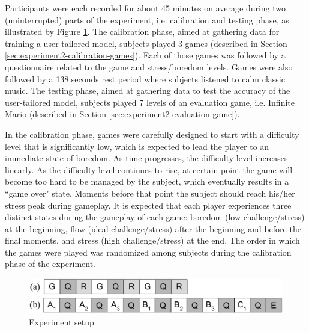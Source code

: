 Participants were each recorded for about 45 minutes on average during two (uninterrupted) parts of the experiment, i.e. calibration and testing phase, as illustrated by Figure \ref{fig:experiment2-parts}. The calibration phase, aimed at gathering data for training a user-tailored model, subjects played 3 games (described in Section \ref{sec:experiment2-calibration-games}). Each of those games was followed by a questionnaire related to the game and stress/boredom levels. Games were also followed by a 138 seconds rest period where subjects listened to calm classic music. The testing phase, aimed at gathering data to test the accuracy of the user-tailored model, subjects played 7 levels of an evaluation game, i.e. Infinite Mario (described in Section \ref{sec:experiment2-evaluation-game}).

In the calibration phase, games were carefully designed to start with a difficulty level that is significantly low, which is expected to lead the player to an immediate state of boredom. As time progresses, the difficulty level increases linearly. As the difficulty level continues to rise, at certain point the game will become too hard to be managed by the subject, which eventually results in a ``game over" state. Moments before that point the subject should reach his/her stress peak during gameplay. It is expected that each player experiences three distinct states during the gameplay of each game: boredom (low challenge/stress) at the beginning, flow (ideal challenge/stress) after the beginning and before the final moments, and stress (high challenge/stress) at the end. The order in which the games were played was randomized among subjects during the calibration phase of the experiment.

\begin{figure}[ht]
  \centering
  \includegraphics[width=\textwidth]{figures/experiment2-parts}
  \caption{Experiment setup}
  \label{fig:experiment2-parts}
\end{figure}


